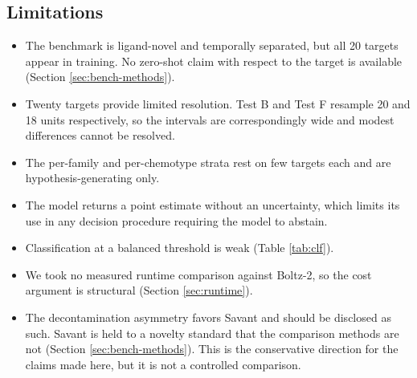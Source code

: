 \documentclass[11pt]{article}
\begin{document}
\subsection*{Limitations}
\begin{itemize}
  \item The benchmark is ligand-novel and temporally separated, but all 20
        targets appear in training. No zero-shot claim with respect to the
        target is available (Section \ref{sec:bench-methods}).
  \item Twenty targets provide limited resolution. Test B and Test F resample
        20 and 18 units respectively, so the intervals are correspondingly wide
        and modest differences cannot be resolved.
  \item The per-family and per-chemotype strata rest on few targets each and
        are hypothesis-generating only.
  \item The model returns a point estimate without an uncertainty, which limits
        its use in any decision procedure requiring the model to abstain.
  \item Classification at a balanced threshold is weak (Table \ref{tab:clf}).
  \item We took no measured runtime comparison against Boltz-2, so the cost
        argument is structural (Section \ref{sec:runtime}).
  \item The decontamination asymmetry favors Savant and should be disclosed as
        such. Savant is held to a novelty standard that the comparison methods
        are not (Section \ref{sec:bench-methods}). This is the conservative
        direction for the claims made here, but it is not a controlled
        comparison.
\end{itemize}
\end{document}
